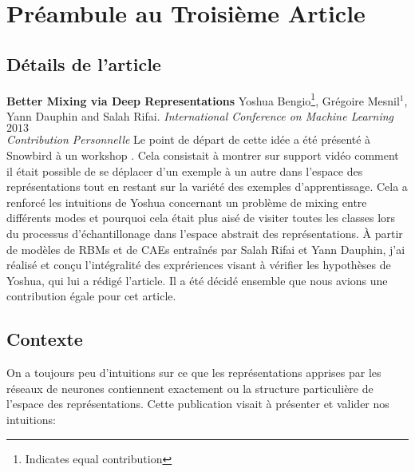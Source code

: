 \chapter{Pr\'{e}ambule au Troisi\`{e}me Article }

\section{D\'{e}tails de l'article}

{\bf Better Mixing via Deep Representations} Yoshua Bengio\footnote{Indicates
equal contribution}, Grégoire Mesnil$^{1}$, Yann Dauphin and Salah Rifai. {\it
International Conference on Machine Learning} $2013$\\

{\it Contribution Personnelle} Le point de départ de cette idée a été présenté
à Snowbird à un workshop \citep{Mesnil-et-al-LW2012}. Cela consistait à montrer
sur support vidéo comment il était possible de se déplacer d'un exemple à un
autre dans l'espace des représentations tout en restant sur la variété des
exemples d'apprentissage. Cela a renforcé les intuitions de Yoshua concernant
un problème de mixing entre différents modes et pourquoi cela était plus aisé
de visiter toutes les classes lors du processus d'échantillonage dans l'espace
abstrait des représentations. À partir de modèles de RBMs et de CAEs entraînés
par Salah Rifai et Yann Dauphin, j'ai réalisé et conçu l'intégralité des
exprériences visant à vérifier les hypothèses de Yoshua, qui lui a rédigé
l'article. Il a été décidé ensemble que nous avions une contribution égale pour
cet article.

\section{Contexte}

On a toujours peu d'intuitions sur ce que les représentations apprises par les
réseaux de neurones contiennent exactement ou la structure particulière de
l'espace des représentations. Cette publication visait à présenter et valider nos intuitions:

\begin{center}
 \end{center}

